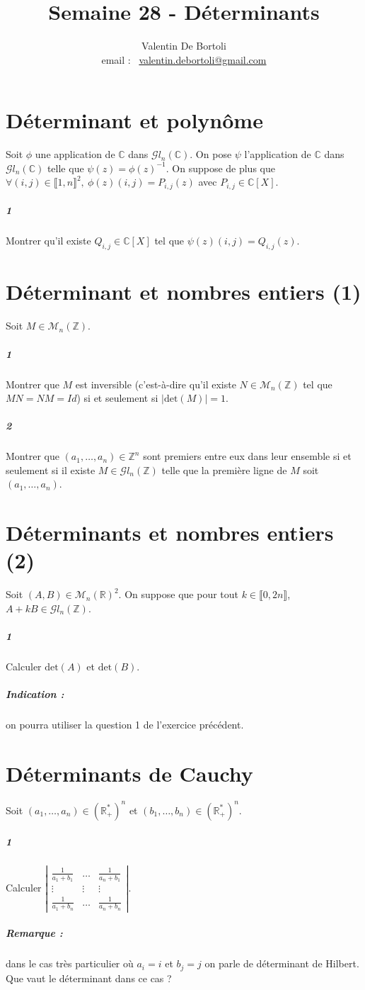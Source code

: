 \documentclass[10pt,a4paper]{article}
\title{Semaine 28 - Déterminants }
\author{Valentin De Bortoli \\ email : \ \href{mailto:valentin.debortoli@gmail.com}{valentin.debortoli@gmail.com}}
\date{}
\begin{document}
\maketitle
\section{Déterminant et polynôme}
Soit $\phi$ une application de $\mathbb{C}$ dans $\mathcal{G}l_n \left(\mathbb{C} \right)$. On pose $\psi$ l'application de $\mathbb{C}$ dans $\mathcal{G}l_n \left(\mathbb{C} \right)$ telle que $\psi(z) = \phi(z)^{-1}$. On suppose de plus que $\forall (i,j) \in \llbracket 1,n \rrbracket^2, \ \phi(z)(i,j)=P_{i,j}(z)$ avec $P_{i,j} \in \mathbb{C}[X]$.
\subparagraph{1}Montrer qu'il existe $Q_{i,j} \in \mathbb{C}[X]$ tel que $\psi(z)(i,j) = Q_{i,j}(z)$.
\section{Déterminant et nombres entiers (1)}
Soit $M \in \mathcal{M}_n \left( \mathbb{Z} \right)$.
\subparagraph{1}Montrer que $M$ est inversible (c'est-à-dire qu'il existe $N \in \mathcal{M}_n \left( \mathbb{Z} \right)$ tel que $MN =NM=Id$) si et seulement si $\vert \text{det}(M) \vert=1$.
\subparagraph{2}Montrer que $(a_1,\dots,a_n) \in \mathbb{Z}^n$ sont premiers entre eux dans leur ensemble si et seulement si il existe $M\in \mathcal{G}l_n \left( \mathbb{Z} \right)$ telle que la première ligne de $M$ soit $(a_1,\dots,a_n)$.

\section{Déterminants et nombres entiers (2)}
Soit $(A,B) \in \mathcal{M}_n\left( \mathbb{R} \right)^2$. On suppose que pour tout $k \in \llbracket 0,2n \rrbracket$, $A+kB \in \mathcal{G}l_n\left( \mathbb{Z} \right)$.
\subparagraph{1}Calculer $\text{det}(A)$ et $\text{det}(B)$.
\subparagraph{Indication :} on pourra utiliser la question 1 de l'exercice précédent.

\section{Déterminants de Cauchy}
Soit $(a_1,\dots,a_n) \in \left(\mathbb{R}_+^*\right)^n$ et $(b_1,\dots,b_n) \in \left(\mathbb{R}_+^*\right)^n$.
\subparagraph{1}Calculer $\left| \begin{matrix} \frac{1}{a_1+b_1} & \dots & \frac{1}{a_n+b_1} \\
\vdots & \vdots & \vdots \\ \frac{1}{a_1+b_n} & \dots & \frac{1}{a_n+b_n}\end{matrix}\right|$.
\subparagraph{Remarque :} dans le cas très particulier où $a_i=i$ et $b_j=j$ on parle de déterminant de Hilbert. Que vaut le déterminant dans ce cas ?
\end{document}
